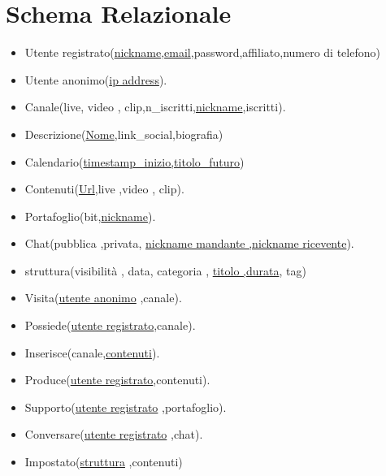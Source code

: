 \section{Schema Relazionale}
\begin{itemize}
    \item Utente registrato(\underline{nickname},\underline{email},password,affiliato,numero di telefono)
    \item Utente anonimo(\underline{ip address}).
    \item Canale(live, video , clip,n\_iscritti,\underline{nickname},iscritti).
    \item Descrizione(\underline{Nome},link\_social,biografia) 
    \item Calendario(\underline{timestamp\_inizio,titolo\_futuro})
    \item Contenuti(\underline{Url},live ,video , clip).
    \item Portafoglio(bit,\underline{nickname}). 
    \item Chat(pubblica ,privata, \underline{nickname mandante ,nickname ricevente}). 
    \item struttura(visibilità , data, categoria , \underline{titolo ,durata}, tag)
    \item Visita(\underline{utente anonimo} ,canale).
    \item Possiede(\underline{utente registrato},canale).
    \item Inserisce(canale,\underline{contenuti}).
    \item Produce(\underline{utente registrato},contenuti).
    \item Supporto(\underline{utente registrato} ,portafoglio).
    \item Conversare(\underline{utente registrato} ,chat).
    \item Impostato(\underline{struttura} ,contenuti)
\end{itemize}